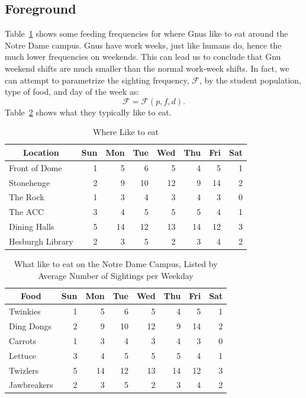 \subsection{Foreground}

Table~\ref{tbl:bogus1} shows some feeding frequencies for where Gnus
like to eat around the Notre Dame campus.  Gnus have work weeks, just
like humans do, hence the much lower frequencies on weekends.  This
can lead us to conclude that Gnu weekend shifts are much smaller than
the normal work-week shifts.  In fact, we can attempt to parametrize the
sighting frequency, $\mathcal{F}$, by the student population, type of food, and
day of the week as:
\begin{equation}
  \mathcal{F} = \mathcal{F}(p,f,d).
\end{equation}
Table~\ref{tbl:bogus2} shows what they
typically like to eat.

\begin{table}[tpb]
  \begin{center}
    \caption{Where  Like to eat \label{tbl:bogus1}}
    \begin{tabularx}{0.85\textwidth}{lrrrrrrr} \toprule
      \multicolumn{1}{c}{Location} & Sun & Mon & Tue & Wed & Thu & Fri & Sat \\ \midrule
      Front of Dome & 1 & 5 & 6 & 5 & 4 & 5 & 1 \\
      Stonehenge & 2 & 9 & 10 & 12 & 9 & 14 & 2 \\
      The Rock & 1 & 3 & 4 & 3 & 4 & 3 & 0 \\
      The ACC & 3 & 4 & 5 & 5 & 5 & 4 & 1 \\
      Dining Halls & 5 & 14 & 12 & 13 & 14 & 12 & 3 \\
      Hesburgh Library & 2 & 3 & 5 & 2 & 3 & 4 & 2 \\ \bottomrule
    \end{tabularx}
  \end{center}
\end{table}

\begin{table}[tpb]
  \setlength{\capwidth}{0.7\textwidth}
  \begin{center}
    \caption{What  like to eat on the Notre Dame Campus, Listed
      by Average Number of Sightings per Weekday
    \label{tbl:bogus2}
}
    \begin{tabular}{lrrrrrrr} \toprule
      \multicolumn{1}{c}{Food} & Sun & Mon & Tue & Wed & Thu & Fri & Sat \\ \midrule
      Twinkies & 1 & 5 & 6 & 5 & 4 & 5 & 1 \\
      Ding Dongs & 2 & 9 & 10 & 12 & 9 & 14 & 2 \\
      Carrots & 1 & 3 & 4 & 3 & 4 & 3 & 0 \\
      Lettuce & 3 & 4 & 5 & 5 & 5 & 4 & 1 \\
      Twizlers & 5 & 14 & 12 & 13 & 14 & 12 & 3 \\
      Jawbreakers & 2 & 3 & 5 & 2 & 3 & 4 & 2 \\ \bottomrule
    \end{tabular}
  \end{center}
\end{table}

